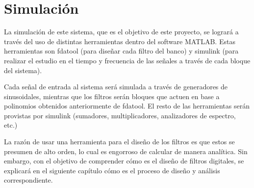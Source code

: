 \section{Simulación}
La simulación de este sistema, que es el objetivo de este proyecto, se logrará a través del uso de distintas herramientas dentro del software MATLAB. Estas herramientas son fdatool (para diseñar cada filtro del banco) y simulink (para realizar el estudio en el tiempo y frecuencia de las señales a través de cada bloque del sistema).

Cada señal de entrada al sistema será simulada a través de generadores de sinusoidales, mientras que los filtros serán bloques que actuen en base a polinomios obtenidos anteriormente de fdatool. El resto de las herramientas serán provistas por simulink (sumadores, multiplicadores, analizadores de espectro, etc.)

La razón de usar una herramienta para el diseño de los filtros es que estos se presumen de alto orden, lo cual es engorroso de calcular de manera analítica. Sin embargo, con el objetivo de comprender cómo es el diseño de filtros digitales, se explicará en el siguiente capítulo cómo es el proceso de diseño y análisis correspondiente.